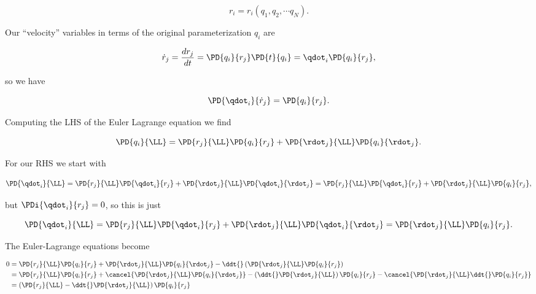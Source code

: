 \begin{equation}\label{eqn:classicalMechanicsPs1:320}
r_i = r_i(q_1, q_2, \cdots q_N).
\end{equation}

Our ``velocity'' variables in terms of the original parameterization $q_i$ are

\begin{equation}\label{eqn:classicalMechanicsPs1:340}
\dot{r}_j = \frac{dr_j}{dt} = \PD{q_i}{r_j} \PD{t}{q_i} = \qdot_i \PD{q_i}{r_j},
\end{equation}

so we have

\begin{equation}\label{eqn:classicalMechanicsPs1:360}
\PD{\qdot_i}{\dot{r}_j} = \PD{q_i}{r_j}.
\end{equation}

Computing the LHS of the Euler Lagrange equation we find

\begin{equation}\label{eqn:classicalMechanicsPs1:380}
\PD{q_i}{\LL} = 
\PD{r_j}{\LL} \PD{q_i}{r_j}
+\PD{\rdot_j}{\LL} \PD{q_i}{\rdot_j}.
\end{equation}

For our RHS we start with

\begin{equation}\label{eqn:classicalMechanicsPs1:400}
\PD{\qdot_i}{\LL} 
= 
\PD{r_j}{\LL} \PD{\qdot_i}{r_j}
+\PD{\rdot_j}{\LL} \PD{\qdot_i}{\rdot_j}
= 
\PD{r_j}{\LL} \PD{\qdot_i}{r_j}
+\PD{\rdot_j}{\LL} \PD{q_i}{r_j},
\end{equation}

but $\PDi{\qdot_i}{r_j} = 0$, so this is just

\begin{equation}\label{eqn:classicalMechanicsPs1:420}
\PD{\qdot_i}{\LL} 
= 
\PD{r_j}{\LL} \PD{\qdot_i}{r_j}
+\PD{\rdot_j}{\LL} \PD{\qdot_i}{\rdot_j}
= 
\PD{\rdot_j}{\LL} \PD{q_i}{r_j}.
\end{equation}

The Euler-Lagrange equations become

\begin{align*}
0 &=
\PD{r_j}{\LL} \PD{q_i}{r_j}
+\PD{\rdot_j}{\LL} \PD{q_i}{\rdot_j}
- 
\ddt{} \left(
\PD{\rdot_j}{\LL} \PD{q_i}{r_j}
\right) \\
&= 
  \PD{r_j}{\LL} \PD{q_i}{r_j}
+ \cancel{\PD{\rdot_j}{\LL} \PD{q_i}{\rdot_j}}
- \left( \ddt{} \PD{\rdot_j}{\LL} \right) \PD{q_i}{r_j}
- \cancel{\PD{\rdot_j}{\LL} \ddt{} \PD{q_i}{r_j} }
\\
&=
\left( \PD{r_j}{\LL} 
-\ddt{} \PD{\rdot_j}{\LL} 
\right) \PD{q_i}{r_j}
\end{align*}

